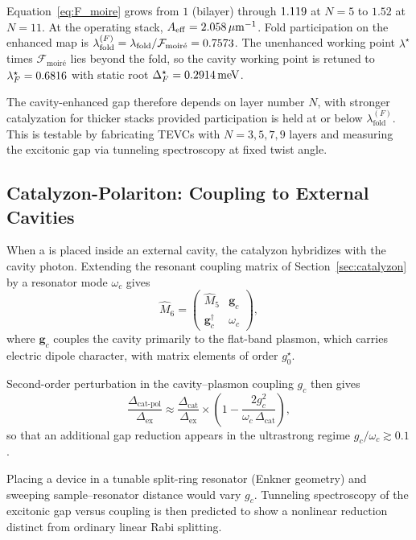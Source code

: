 \documentclass[11pt,letterpaper]{article}
\begin{document}
Equation~\eqref{eq:F_moire} grows from $1$ (bilayer) through $1.119$ at $N=5$ to $1.52$ at $N=11$. At the operating stack, $A_{\mathrm{eff}}=2.058\,\mu\mathrm{m}^{-1}$. Fold participation on the enhanced map is $\lambda_{\mathrm{fold}}^{(F)}=\lambda_{\mathrm{fold}}/\mathcal{F}_{\text{moir\'{e}}}=0.7573$. The unenhanced working point $\lambda^\star$ times $\mathcal{F}_{\text{moir\'{e}}}$ lies beyond the fold, so the cavity working point is retuned to $\lambda^\star_F=0.6816$ with static root $\Delta^\star_F=0.2914\,\mathrm{meV}$.

The cavity-enhanced gap therefore depends on layer number $N$, with stronger catalyzation for thicker stacks provided participation is held at or below $\lambda_{\mathrm{fold}}^{(F)}$. This is testable by fabricating TEVCs with $N = 3, 5, 7, 9$ layers and measuring the excitonic gap via tunneling spectroscopy at fixed twist angle.

\subsection{Catalyzon-Polariton: Coupling to External Cavities}
\label{sec:cat_polariton}

When a \TEVC{} is placed inside an external cavity, the catalyzon hybridizes with the cavity photon. Extending the resonant coupling matrix of Section~\ref{sec:catalyzon} by a resonator mode $\omega_c$ gives
\begin{equation}
\hat{M}_6 = \begin{pmatrix} \hat{M}_5 & \mathbf{g}_c \\ \mathbf{g}_c^\dagger & \omega_c \end{pmatrix},
\end{equation}
where $\mathbf{g}_c$ couples the cavity primarily to the flat-band plasmon, which carries electric dipole character, with matrix elements of order $g_0^\star$.

Second-order perturbation in the cavity--plasmon coupling $g_c$ then gives
\begin{equation}
\frac{\Delta_{\text{cat-pol}}}{\Delta_{\text{ex}}} \approx \frac{\Delta_{\text{cat}}}{\Delta_{\text{ex}}} \times \left(1 - \frac{2g_c^2}{\omega_c \,\Delta_{\text{cat}}}\right),
\end{equation}
so that an additional gap reduction appears in the ultrastrong regime $g_c/\omega_c \gtrsim 0.1$.

Placing a \MATBG{} device in a tunable split-ring resonator (Enkner geometry) and sweeping sample--resonator distance would vary $g_c$. Tunneling spectroscopy of the excitonic gap versus coupling is then predicted to show a nonlinear reduction distinct from ordinary linear Rabi splitting.
\end{document}
